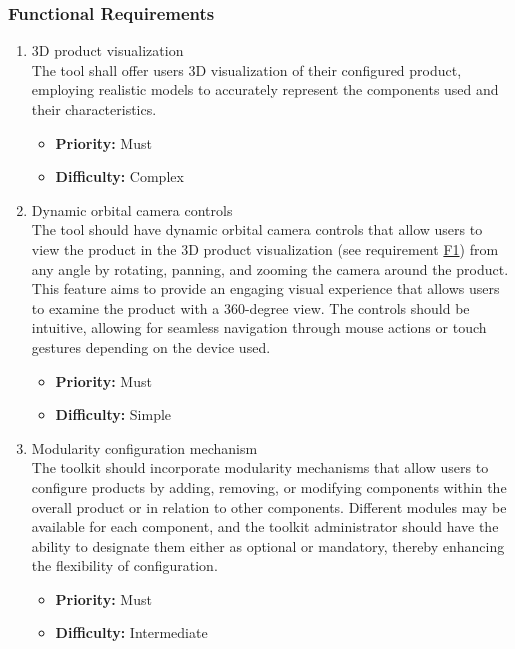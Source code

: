 \subsubsection{Functional Requirements}

\begin{enumerate}[label=\textbf{F\arabic*:}, leftmargin=30pt]
\item \label{itm:F1} 3D product visualization
\vspace{2pt}
\\The tool shall offer users 3D visualization of their configured product, employing realistic models to accurately represent the components used and their characteristics.
\begin{itemize}[noitemsep, label=\trianglebullet]
    \item \textbf{Priority:} Must
    \item \textbf{Difficulty:} Complex
\end{itemize}
\vspace{4pt}

\item \label{itm:F2} Dynamic orbital camera controls
\vspace{2pt}
\\The tool should have dynamic orbital camera controls that allow users to view the product in the 3D product visualization (see requirement \hyperref[itm:F1]{F1}) from any angle by rotating, panning, and zooming the camera around the product. This feature aims to provide an engaging visual experience that allows users to examine the product with a 360-degree view. The controls should be intuitive, allowing for seamless navigation through mouse actions or touch gestures depending on the device used.
\begin{itemize}[noitemsep, label=\trianglebullet]
    \item \textbf{Priority:} Must
    \item \textbf{Difficulty:} Simple
\end{itemize}
\vspace{4pt}

\item \label{itm:F3} Modularity configuration mechanism
\vspace{2pt}
\\The toolkit should incorporate modularity mechanisms that allow users to configure products by adding, removing, or modifying components within the overall product or in relation to other components. Different modules may be available for each component, and the toolkit administrator should have the ability to designate them either as optional or mandatory, \phantom{thereby enhancing the flexibility of configuration.}\newpage thereby enhancing the flexibility of configuration.
\begin{itemize}[noitemsep, label=\trianglebullet]
    \item \textbf{Priority:} Must
    \item \textbf{Difficulty:} Intermediate
\end{itemize}
\vspace{4pt}


\end{enumerate}
